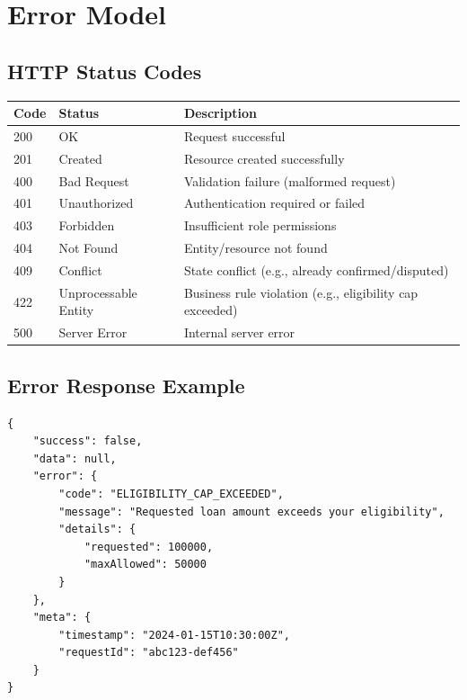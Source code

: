 \documentclass[11pt,a4paper]{article}
\begin{document}
\section{Error Model}

\subsection{HTTP Status Codes}

\begin{tabular}{@{}p{1.5cm}p{3cm}p{8.5cm}@{}}
\toprule
\textbf{Code} & \textbf{Status} & \textbf{Description} \\
\midrule
200 & OK & Request successful \\
201 & Created & Resource created successfully \\
400 & Bad Request & Validation failure (malformed request) \\
401 & Unauthorized & Authentication required or failed \\
403 & Forbidden & Insufficient role permissions \\
404 & Not Found & Entity/resource not found \\
409 & Conflict & State conflict (e.g., already confirmed/disputed) \\
422 & Unprocessable Entity & Business rule violation (e.g., eligibility cap exceeded) \\
500 & Server Error & Internal server error \\
\bottomrule
\end{tabular}

\subsection{Error Response Example}

\begin{lstlisting}
{
    "success": false,
    "data": null,
    "error": {
        "code": "ELIGIBILITY_CAP_EXCEEDED",
        "message": "Requested loan amount exceeds your eligibility",
        "details": {
            "requested": 100000,
            "maxAllowed": 50000
        }
    },
    "meta": {
        "timestamp": "2024-01-15T10:30:00Z",
        "requestId": "abc123-def456"
    }
}
\end{lstlisting}

\end{document}
